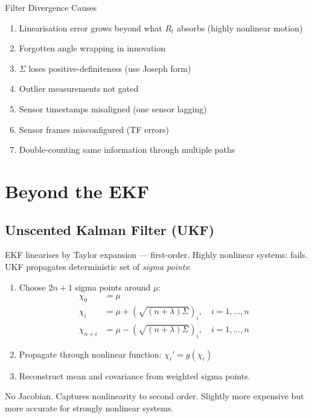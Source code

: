 \documentclass[11pt,a4paper]{article}
\begin{document}
\begin{warnbox}{Filter Divergence Causes}
\begin{enumerate}
\item Linearisation error grows beyond what $R_t$ absorbs (highly nonlinear motion)
\item Forgotten angle wrapping in innovation
\item $\Sigma$ loses positive-definiteness (use Joseph form)
\item Outlier measurements not gated
\item Sensor timestamps misaligned (one sensor lagging)
\item Sensor frames misconfigured (TF errors)
\item Double-counting same information through multiple paths
\end{enumerate}
\end{warnbox}

\section{Beyond the EKF}

\subsection{Unscented Kalman Filter (UKF)}

EKF linearises by Taylor expansion --- first-order. Highly nonlinear systems: fails. UKF propagates deterministic set of \emph{sigma points}:

\begin{enumerate}
\item Choose $2n+1$ sigma points around $\mu$:
\begin{align*}
\chi_0 &= \mu \\
\chi_i &= \mu + (\sqrt{(n+\lambda)\Sigma})_i, \quad i = 1, \ldots, n \\
\chi_{n+i} &= \mu - (\sqrt{(n+\lambda)\Sigma})_i, \quad i = 1, \ldots, n
\end{align*}
\item Propagate through nonlinear function: $\chi_i' = g(\chi_i)$
\item Reconstruct mean and covariance from weighted sigma points.
\end{enumerate}

No Jacobian. Captures nonlinearity to second order. Slightly more expensive but more accurate for strongly nonlinear systems.
\end{document}
